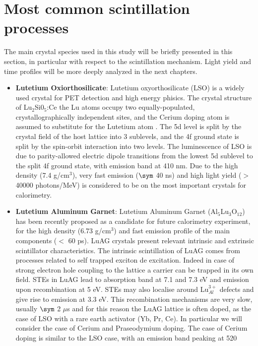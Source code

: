 \section{Most common scintillation processes}
The main crystal species used in this study will be briefly presented in this section, in particular with respect to the scintillation mechanism. Light yield and time profiles will be more deeply analyzed in the next chapters.
\begin{itemize}
\item \textbf{Lutetium Oxiorthosilicate}: Lutetium oxyorthosilicate (LSO) is a widely used crystal for PET detection and high energy phisics. The crystal structure of Lu$_{2}$Si0$_{5}$:Ce the Lu atoms occupy two equally-populated, crystallographically independent sites, and the Cerium doping atom is assumed to substitute for the Lutetium atom \cite{Naud1996}.
The 5d level is split by the crystal field of the host lattice into 3 sublevels, and the 4f ground state is split by the spin-orbit interaction into two levels.
The luminescence of LSO is due to parity-allowed electric dipole transitions from the lowest 5d sublevel to the split 4f ground state, with emission band at 410 nm.
Due to the high density (7.4 g/cm$^{3}$), very fast emission ($\sym$ 40 ns) and high light yield ($>$40000 photons/MeV) is considered to be on the most important crystals for calorimetry.
\item \textbf{Lutetium Aluminum Garnet}: Lutetium Aluminum Garnet (Al$_{5}$Lu$_{3}$O$_{12}$) has been recently proposed as a candidate for future calorimetry experiment\cite{Kris2013}, for the high density (6.73 g/cm$^{3}$) and fast emission profile of the main components ($<$ 60 ps).
LuAG crystals present relevant intrinsic and extrinsic scintillator characteristics.
The intrinsic scintillation of LuAG comes from processes related to self trapped exciton de excitation. Indeed in case of strong electron hole coupling to the lattice a carrier can be trapped in its own field.
STEs in LuAG lead to absorption band at 7.1 and 7.3 eV and emission upon recombination at 5 eV.
STEs may also localise around Lu$_{Al}^{3+}$ defects and give rise to emission at 3.3 eV.
This recombination mechanisms are very slow, usually $\sym$ 2 $\mu$s and for this reason the LuAG lattice is often doped, as the case of LSO with a rare earth activator (Yb, Pr, Ce).
In particular we will consider the case of Cerium and Praseodymium doping.
The case of Cerium doping is similar to the LSO case, with an emission band peaking at 520

\end{itemize}
